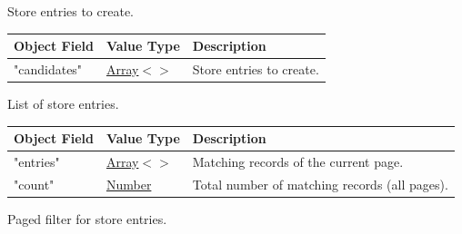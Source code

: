 \documentclass[a4paper]{arrowhead}
\newcommand{\mref}[2][]{{\textcolor{ArrowheadPurple}{\hyperref[sec:model:#2]{\ifstrempty{#1}{#2}{#1}}}}}
\newcommand{\pref}[1]{{\textcolor{ArrowheadGrey}{\hyperref[sec:model:primitives:#1]{#1}}}}
\begin{document}

Store entries to create.


\noindent\begin{tabularx}{\textwidth}{| >{\raggedright\arraybackslash}p{3.9cm} | >{\raggedright\arraybackslash\small}p{5.3cm} | X |} \hline
\rowcolor{gray!33} Object Field & Value Type & Description \\ \hline
"candidates" & \pref{Array}$<$\allowbreak{}\mref[Orchestration\allowbreak{}Simple\allowbreak{}Store\allowbreak{}Request]{OrchestrationSimpleStoreRequest}$>$ & Store entries to create. \\ \hline
\end{tabularx}




List of store entries.


\noindent\begin{tabularx}{\textwidth}{| >{\raggedright\arraybackslash}p{3.9cm} | >{\raggedright\arraybackslash\small}p{5.3cm} | X |} \hline
\rowcolor{gray!33} Object Field & Value Type & Description \\ \hline
"entries" & \pref{Array}$<$\allowbreak{}\mref[Orchestration\allowbreak{}Simple\allowbreak{}Store\allowbreak{}Response]{OrchestrationSimpleStoreResponse}$>$ & Matching records of the current page. \\ \hline
"count" & \pref{Number} & Total number of matching records (all pages). \\ \hline
\end{tabularx}




Paged filter for store entries.
\end{document}

